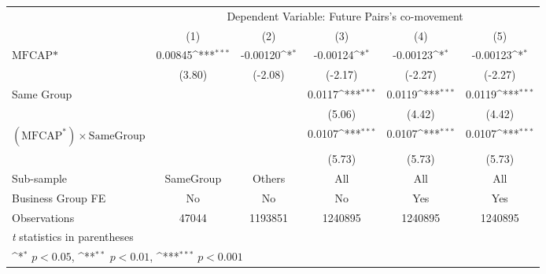 {
\def\sym#1{\ifmmode^{#1}\else\(^{#1}\)\fi}
\begin{tabular}{l*{5}{c}}
\hline\hline
                &\multicolumn{5}{c}{Dependent Variable:  Future Pairs's co-movement}                           \\\cmidrule(lr){2-6}
                &\multicolumn{1}{c}{(1)}         &\multicolumn{1}{c}{(2)}         &\multicolumn{1}{c}{(3)}         &\multicolumn{1}{c}{(4)}         &\multicolumn{1}{c}{(5)}         \\
\hline
$ \text{MFCAP*} $&  0.00845\sym{***}& -0.00120\sym{*}  & -0.00124\sym{*}  & -0.00123\sym{*}  & -0.00123\sym{*}  \\
                &   (3.80)         &  (-2.08)         &  (-2.17)         &  (-2.27)         &  (-2.27)         \\
[1em]
Same Group      &                  &                  &   0.0117\sym{***}&   0.0119\sym{***}&   0.0119\sym{***}\\
                &                  &                  &   (5.06)         &   (4.42)         &   (4.42)         \\
[1em]
 $ (\text{MFCAP}^*) \times {\text{SameGroup} }  $ &                  &                  &   0.0107\sym{***}&   0.0107\sym{***}&   0.0107\sym{***}\\
                &                  &                  &   (5.73)         &   (5.73)         &   (5.73)         \\
\hline
Sub-sample      &SameGroup         &   Others         &      All         &      All         &      All         \\
Business Group FE&       No         &       No         &       No         &      Yes         &      Yes         \\
Observations    &    47044         &  1193851         &  1240895         &  1240895         &  1240895         \\
\hline\hline
\multicolumn{6}{l}{\footnotesize \textit{t} statistics in parentheses}\\
\multicolumn{6}{l}{\footnotesize \sym{*} \(p<0.05\), \sym{**} \(p<0.01\), \sym{***} \(p<0.001\)}\\
\end{tabular}
}
